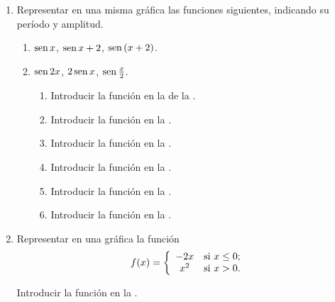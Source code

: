 \begin{enumerate}[leftmargin=*]
\item Representar en una misma gráfica las funciones siguientes, indicando su período y amplitud.
      \begin{enumerate}
      \item $\operatorname{sen}{x}$, $\operatorname{sen}{x}+2$, $\operatorname{sen}{(x+2)}$.
      \item $\operatorname{sen}{2x}$, $2\operatorname{sen}{x}$, $\operatorname{sen}\frac{x}{2}$.
            \begin{indication}
            \begin{enumerate}
            \item Introducir la función  en la  de la .
            \item Introducir la función  en la .
            \item Introducir la función  en la .
            \item Introducir la función  en la .
            \item Introducir la función  en la .
            \item Introducir la función  en la .
            \end{enumerate}
            \end{indication}
      \end{enumerate}


\item Representar en una gráfica la función
      \[
      \ f(x)=\left\{
      \begin{array}{cl}
      -2x   & \hbox{si $x\leq0$;} \\
      x^{2} & \hbox{si $x>0$.}    \\
      \end{array}
      \right.
      \]

      \begin{indication}
      Introducir la función  en la .
      \end{indication}
\end{enumerate}


